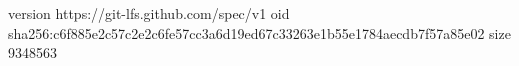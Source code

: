 version https://git-lfs.github.com/spec/v1
oid sha256:c6f885e2c57c2e2c6fe57cc3a6d19ed67c33263e1b55e1784aecdb7f57a85e02
size 9348563
